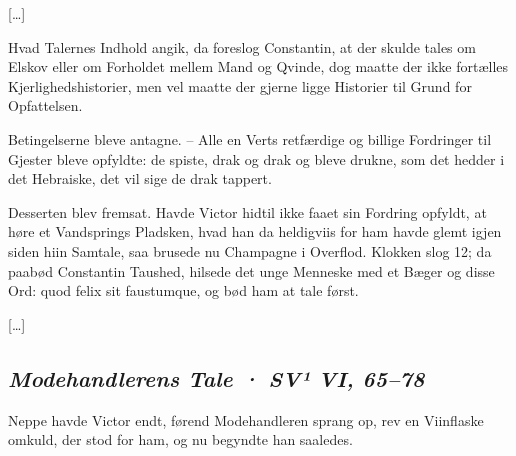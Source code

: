 \documentclass[12pt,a4paper]{article}
\newcommand{\sectionheading}[1]{\subsection*{\normalfont\itshape #1}}
\begin{document}
[…]

Hvad Talernes Indhold angik, da foreslog Constantin, at der skulde tales om Elskov eller om Forholdet mellem Mand og Qvinde, dog maatte der ikke fortælles Kjerlighedshistorier, men vel maatte der gjerne ligge Historier til Grund for Opfattelsen.

Betingelserne bleve antagne. – Alle en Verts retfærdige og billige Fordringer til Gjester bleve opfyldte: de spiste, drak og drak og bleve drukne, som det hedder i det Hebraiske, det vil sige de drak tappert.

Desserten blev fremsat. Havde Victor hidtil ikke faaet sin Fordring opfyldt, at høre et Vandsprings Pladsken, hvad han da heldigviis for ham havde glemt igjen siden hiin Samtale, saa brusede nu Champagne i Overflod. Klokken slog 12; da paabød Constantin Taushed, hilsede det unge Menneske med et Bæger og disse Ord: quod felix sit faustumque, og bød ham at tale først.

[…]

\sectionheading{Modehandlerens Tale  ·  SV¹ VI, 65–78}

Neppe havde Victor endt, førend Modehandleren sprang op, rev en Viinflaske omkuld, der stod for ham, og nu begyndte han saaledes.
\end{document}
